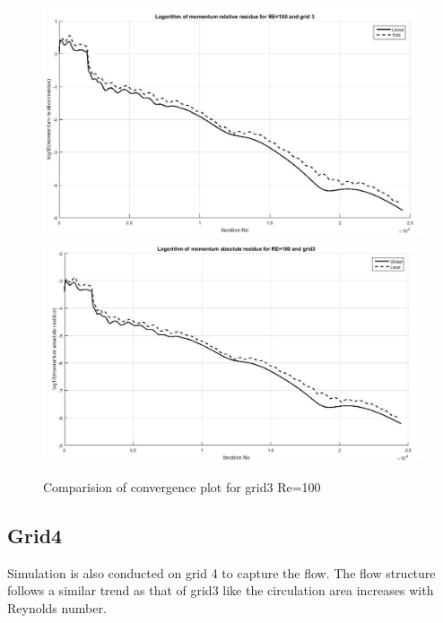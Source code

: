 \documentclass[12pt]{elsarticle}
\begin{document}
	\begin{figure}[htbp]
		\caption{Comparision of convergence plot for grid3 Re=100}
		\centering\includegraphics[width=1.0\linewidth]{grid3_rr_comparision}
		\centering\includegraphics[width=1.0\linewidth]{grid3_ar_comparision}
	\end{figure}
	
	
	\clearpage
	\subsection{Grid4}
	Simulation is also conducted on grid 4 to capture the flow. The flow structure follows a similar trend as that of grid3 like the circulation area increases with Reynolds number. 
	
\end{document}
